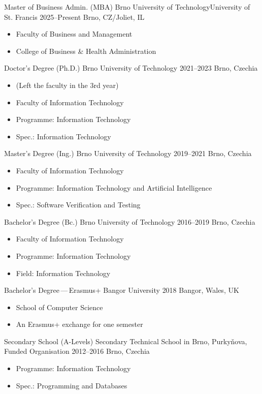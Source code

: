 

\cvevent
{Master of Business Admin. (MBA)}
{Brno University of Technology{\newline}University of St. Francis}
{2025--Present}
{Brno, CZ/Joliet, IL}
\begin{itemize}\small
    \item Faculty of Business and Management
    \item College of Business \& Health Administration
\end{itemize}

\divider\smallskip

\cvevent
{Doctor's Degree (Ph.D.)}
{Brno University of Technology}
{2021--2023}
{Brno, Czechia}
\begin{itemize}\small
    \item (Left the faculty in the 3rd year)
    \item Faculty of Information Technology
    \item Programme: Information Technology
    \item Spec.: Information Technology
\end{itemize}
\medskip

\cvevent
{Master's Degree (Ing.)}
{Brno University of Technology}
{2019--2021}
{Brno, Czechia}
\begin{itemize}\small
    \item Faculty of Information Technology
    \item Programme: Information Technology and Artificial Intelligence
    \item Spec.: Software Verification and Testing
\end{itemize}
\medskip

\cvevent
{Bachelor's Degree (Bc.)}
{Brno University of Technology}
{2016--2019}
{Brno, Czechia}
\begin{itemize}\small
    \item Faculty of Information Technology
    \item Programme: Information Technology
    \item Field: Information Technology
\end{itemize}
\medskip

\cvevent
{Bachelor's Degree\,---\,Erasmus+}
{Bangor University}
{2018}
{Bangor, Wales, UK}
\begin{itemize}\small
    \item School of Computer Science
    \item An Erasmus+ exchange for one semester
\end{itemize}

\divider\smallskip

\cvevent
{Secondary School (A-Levels)}
{Secondary Technical School in Brno, Purky\v{n}ova, Funded Organisation}
{2012--2016}
{Brno, Czechia}
\begin{itemize}\small
    \item Programme: Information Technology
    \item Spec.: Programming and Databases
\end{itemize}
